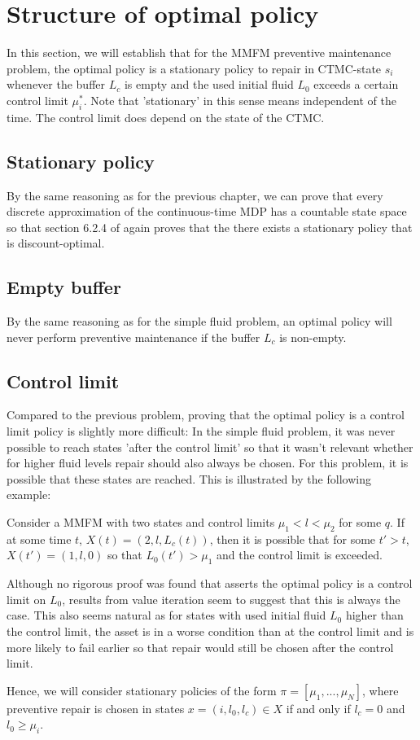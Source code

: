 \section{Structure of optimal policy}
In this section, we will establish that for the MMFM preventive maintenance problem, the optimal policy is a stationary policy to repair in CTMC-state $s_i$ whenever the buffer $L_c$ is empty and the used initial fluid $L_0$ exceeds a certain control limit $\mu_i^*$.
Note that 'stationary' in this sense means independent of the time. 
The control limit does depend on the state of the CTMC.

\subsection{Stationary policy}
By the same reasoning as for the previous chapter, we can prove that every discrete approximation of the continuous-time MDP has a countable state space so that section 6.2.4 of \cite{Puterman2008} again proves that the there exists a stationary policy that is discount-optimal.

\subsection{Empty buffer}
By the same reasoning as for the simple fluid problem, an optimal policy will never perform preventive maintenance if the buffer $L_c$ is non-empty.

\subsection{Control limit}
Compared to the previous problem, proving that the optimal policy is a control limit policy is slightly more difficult:
In the simple fluid problem, it was never possible to reach states 'after the control limit' so that it wasn't relevant whether for higher fluid levels repair should also always be chosen.
For this problem, it is possible that these states are reached.
This is illustrated by the following example:
\begin{example}
	Consider a MMFM with two states and control limits $\mu_1<l<\mu_2$ for some $q$.
	If at some time $t$, $X(t)=(2,l,L_c(t))$, then it is possible that for some $t'>t$, $X(t')=(1,l,0)$ so that $L_0(t')>\mu_1$ and the control limit is exceeded.
\end{example}
Although no rigorous proof was found that asserts the optimal policy is a control limit on $L_0$, results from value iteration seem to suggest that this is always the case.
This also seems natural as for states with used initial fluid $L_0$ higher than the control limit, the asset is in a worse condition than at the control limit and is more likely to fail earlier so that repair would still be chosen after the control limit.

Hence, we will consider stationary policies of the form $\pi=[\mu_1,...,\mu_N]$, where preventive repair is chosen in states $x=(i,l_0,l_c)\in X$ if and only if $l_c=0$ and $l_0\geq \mu_i$.